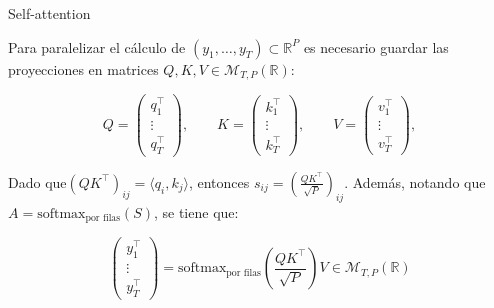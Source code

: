 \documentclass{beamer}
\newcommand{\R}{\mathbb{R}}
\begin{document}
\begin{frame}{Self-attention}

    Para paralelizar el cálculo de $(y_1,\ldots,y_T)\subset\R^P$ es necesario guardar las proyecciones en matrices $Q,K,V\in \mathcal{M}_{T,P}(\R)$:

    \begin{equation*}
        Q=\left(
        \begin{matrix}
            q_1^\top \\
            \vdots   \\
            q_T^\top
        \end{matrix}
        \right),
        \qquad
        K=\left(
        \begin{matrix}
            k_1^\top \\
            \vdots   \\
            k_T^\top
        \end{matrix}
        \right),
        \qquad
        V=\left(
        \begin{matrix}
            v_1^\top \\
            \vdots   \\
            v_T^\top
        \end{matrix}
        \right),
    \end{equation*}

    Dado que$(QK^\top)_{ij}= \langle q_i,k_j\rangle$, entonces $s_{ij}=\left(\frac{QK^\top}{\sqrt{P}}\right)_{ij}$. Además, notando que $A=\text{softmax}_\text{por filas}\left(S\right)$, se tiene que:


    \begin{equation*}
        \left(
        \begin{matrix}
            y_1^\top \\
            \vdots   \\
            y_T^\top
        \end{matrix}
        \right)=\text{softmax}_\text{por filas}\left(\frac{QK^\top}{\sqrt{P}}\right)V
        \in\mathcal{M}_{T,P}(\R)
    \end{equation*}

\end{frame}
\end{document}
